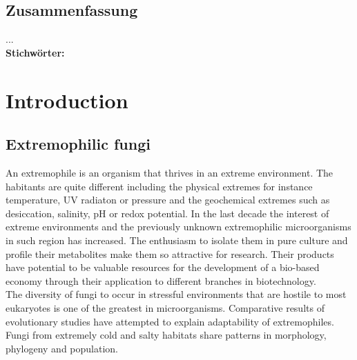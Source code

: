 \documentclass[12pt, a4paper]{report}
\begin{document}
\section*{Zusammenfassung}
...\\
\textbf{Stichw\"orter:}  
\newpage
\tableofcontents
\newpage
\setcounter{chapter}{1}
\setcounter{figure}{0}

\chapter*{Introduction} 
\section{Extremophilic fungi}
An extremophile is an organism that thrives in an extreme environment. The habitants are quite different including the physical extremes for instance temperature, UV radiaton or pressure and the geochemical extremes such as desiccation, salinity, pH or redox potential. \cite{Rothschild2001} 
In the last decade the interest of extreme environments and the previously unknown extremophilic microorganisms in such region has increased. The enthusiasm to isolate them in pure culture and profile their metabolites make them so attractive for research. Their products have potential to be valuable resources for the development of a bio-based economy through their application to different branches in biotechnology. \cite{Raddadi2015} \\
The diversity of fungi to occur in stressful environments that are hostile to most eukaryotes is one of the greatest in microorganisms. Comparative results of evolutionary studies have attempted to explain adaptability of extremophiles. Fungi from extremely cold and salty habitats share patterns in morphology, phylogeny and population. \cite{Gostincar2010} 
\end{document}
